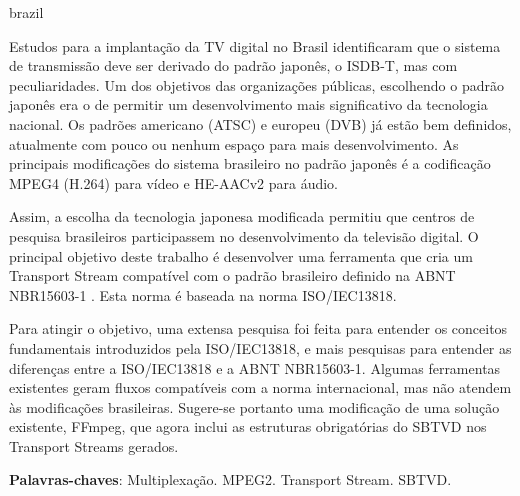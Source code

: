 \documentclass[
	12pt,				%
	openright,			%
	twoside,			%
	a4paper,			%
	brazil,
	french,				%
	english
	]{abntex2}
\begin{document}


\setlength{\absparsep}{18pt} %
\begin{resumo}[Resumo]
 \begin{otherlanguage*}{brazil}
	
Estudos para a implantação da TV digital no Brasil identificaram que o sistema de transmissão deve ser derivado do padrão japonês, o ISDB-T, mas com peculiaridades. Um dos objetivos das organizações públicas, escolhendo o padrão japonês era o de permitir um desenvolvimento mais significativo da tecnologia nacional. Os padrões americano (ATSC) e europeu (DVB) já estão bem definidos, atualmente com pouco ou nenhum espaço para mais desenvolvimento. As principais modificações do sistema brasileiro no padrão japonês é a codificação MPEG4 (H.264) para vídeo e HE-AACv2 para áudio.

Assim, a escolha da tecnologia japonesa modificada permitiu que centros de pesquisa brasileiros participassem no desenvolvimento da televisão digital. O principal objetivo deste trabalho é desenvolver uma ferramenta que cria um Transport Stream compatível com o padrão brasileiro definido na ABNT NBR15603-1 . Esta norma é baseada na norma ISO/IEC13818.

Para atingir o objetivo, uma extensa pesquisa foi feita para entender os conceitos fundamentais introduzidos pela ISO/IEC13818, e mais pesquisas para entender as diferenças entre a ISO/IEC13818 e a ABNT NBR15603-1. Algumas ferramentas existentes geram fluxos compatíveis com a norma internacional, mas não atendem às modificações brasileiras. Sugere-se portanto uma modificação de uma solução existente, FFmpeg, que agora inclui as estruturas obrigatórias do SBTVD nos Transport Streams gerados.

 \textbf{Palavras-chaves}: Multiplexação. MPEG2. Transport Stream. SBTVD.
 \end{otherlanguage*}
\end{resumo}
\end{document}
